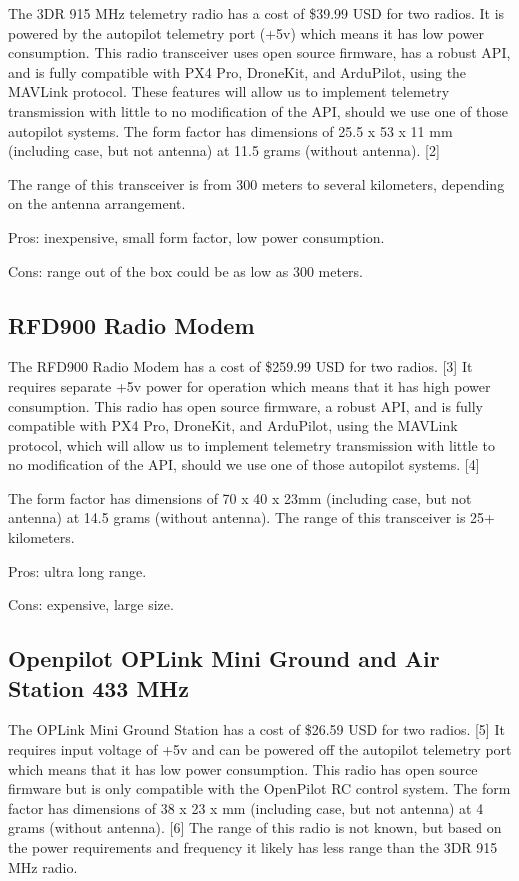 \documentclass[compsoc,draftclsnofoot,onecolumn,10pt]{IEEEtran}
\begin{document}
The 3DR 915 MHz telemetry radio has a cost of \$39.99 USD for two radios. It is
powered by the autopilot telemetry port (+5v) which means it has low power
consumption. This radio transceiver uses open source firmware, has a robust API,
and is fully compatible with PX4 Pro, DroneKit, and ArduPilot, using the MAVLink
protocol. These features will allow us to implement telemetry transmission with
little to no modification of the API, should we use one of those autopilot
systems.  The form factor has dimensions of 25.5 x 53 x 11 mm (including case,
but not antenna) at 11.5 grams (without antenna). [2]

The range of this transceiver is from 300 meters to several kilometers,
depending on the antenna arrangement.

Pros: inexpensive, small form factor, low power consumption.

Cons: range out of the box could be as low as 300 meters.


\subsection{RFD900 Radio Modem}

The RFD900 Radio Modem has a cost of \$259.99 USD for two radios. [3] It requires
separate +5v power for operation which means that it has high power
consumption. This radio has open source firmware, a robust API, and is fully
compatible with PX4 Pro, DroneKit, and ArduPilot, using the MAVLink protocol,
which will allow us to implement telemetry transmission with little to no
modification of the API, should we use one of those autopilot systems. [4]

The form factor has dimensions of 70 x 40 x 23mm (including case, but not
antenna) at 14.5 grams (without
antenna).
The range of this transceiver is 25+ kilometers.

Pros: ultra long range.

Cons: expensive, large size.


\subsection{Openpilot OPLink Mini Ground and Air Station 433 MHz}

The OPLink Mini Ground Station has a cost of \$26.59 USD for two radios. [5] It
requires input voltage of +5v and can be powered off the autopilot telemetry
port which means that it has low power consumption. This radio has open source
firmware but is only compatible with the OpenPilot RC control system. 
The form factor has dimensions of 38 x 23 x mm (including case, but not
antenna) at 4 grams (without antenna). [6]
The range of this radio is not known, but based on the power requirements and
frequency it likely has less range than the 3DR 915 MHz radio.
\end{document}
